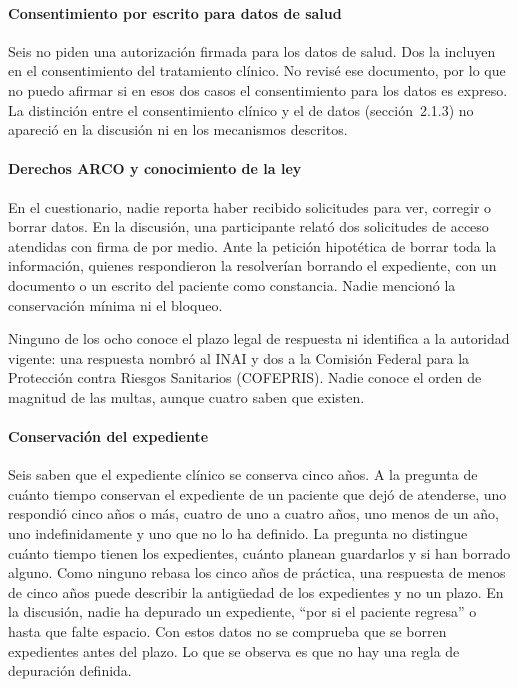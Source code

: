 \documentclass[12pt, a4paper]{article}
\begin{document}
\paragraph{Consentimiento por escrito para datos de salud}
Seis no piden una autorización firmada para los datos de salud. Dos la incluyen en el consentimiento del tratamiento clínico. No revisé ese documento, por lo que no
puedo afirmar si en esos dos casos el consentimiento para los datos es expreso. La distinción entre el
consentimiento clínico y el de datos (sección~2.1.3) no apareció en la
discusión ni en los mecanismos descritos.
 
\paragraph{Derechos ARCO y conocimiento de la ley}
En el cuestionario, nadie reporta haber recibido solicitudes para ver,
corregir o borrar datos. En la discusión, una participante relató dos
solicitudes de acceso atendidas con firma de por medio. Ante la petición hipotética de borrar
toda la información, quienes respondieron la resolverían borrando el
expediente, con un documento o un escrito del paciente como constancia.
Nadie mencionó la conservación mínima ni el bloqueo.

Ninguno de los ocho conoce el plazo legal de respuesta ni identifica a
la autoridad vigente: una respuesta nombró al INAI y dos a la Comisión
Federal para la Protección contra Riesgos Sanitarios (COFEPRIS). Nadie
conoce el orden de magnitud de las multas, aunque cuatro saben que
existen.

\paragraph{Conservación del expediente} Seis saben que el expediente clínico se conserva cinco
años. A la pregunta de cuánto tiempo conservan el expediente de un paciente que dejó de atenderse, uno respondió cinco años o más, cuatro de uno a cuatro años, uno menos de un año, uno indefinidamente y uno que no lo ha definido. La pregunta no distingue cuánto tiempo tienen los expedientes, cuánto planean guardarlos y si han borrado alguno. Como ninguno rebasa los cinco años de práctica, una respuesta de menos de cinco años puede describir la antigüedad de los expedientes y no un plazo. En la discusión, nadie ha depurado
un expediente, ``por si el paciente regresa'' o hasta que falte espacio. Con estos datos no se comprueba que se borren expedientes antes del plazo. Lo que se observa es que no hay una regla de depuración definida.
\end{document}
